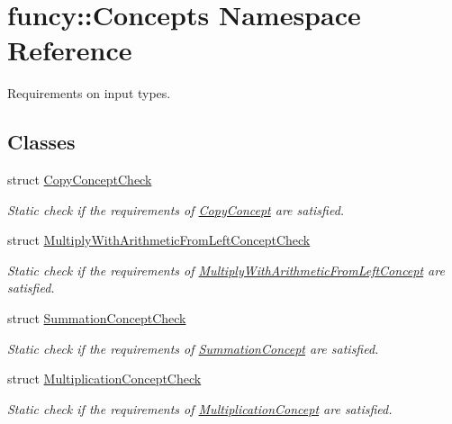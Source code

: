 \hypertarget{namespacefuncy_1_1Concepts}{\section{funcy\-:\-:Concepts Namespace Reference}
\label{namespacefuncy_1_1Concepts}
}


Requirements on input types.  


\subsection*{Classes}
\begin{DoxyCompactItemize}
\item 
struct \hyperlink{structfuncy_1_1Concepts_1_1CopyConceptCheck}{Copy\-Concept\-Check}
\begin{DoxyCompactList}\small\item\em Static check if the requirements of \hyperlink{structfuncy_1_1Concepts_1_1CopyConcept}{Copy\-Concept} are satisfied. \end{DoxyCompactList}\item 
struct \hyperlink{structfuncy_1_1Concepts_1_1MultiplyWithArithmeticFromLeftConceptCheck}{Multiply\-With\-Arithmetic\-From\-Left\-Concept\-Check}
\begin{DoxyCompactList}\small\item\em Static check if the requirements of \hyperlink{structfuncy_1_1Concepts_1_1MultiplyWithArithmeticFromLeftConcept}{Multiply\-With\-Arithmetic\-From\-Left\-Concept} are satisfied. \end{DoxyCompactList}\item 
struct \hyperlink{structfuncy_1_1Concepts_1_1SummationConceptCheck}{Summation\-Concept\-Check}
\begin{DoxyCompactList}\small\item\em Static check if the requirements of \hyperlink{structfuncy_1_1Concepts_1_1SummationConcept}{Summation\-Concept} are satisfied. \end{DoxyCompactList}\item 
struct \hyperlink{structfuncy_1_1Concepts_1_1MultiplicationConceptCheck}{Multiplication\-Concept\-Check}
\begin{DoxyCompactList}\small\item\em Static check if the requirements of \hyperlink{structfuncy_1_1Concepts_1_1MultiplicationConcept}{Multiplication\-Concept} are satisfied. \end{DoxyCompactList}\item 

\end{DoxyCompactItemize}
